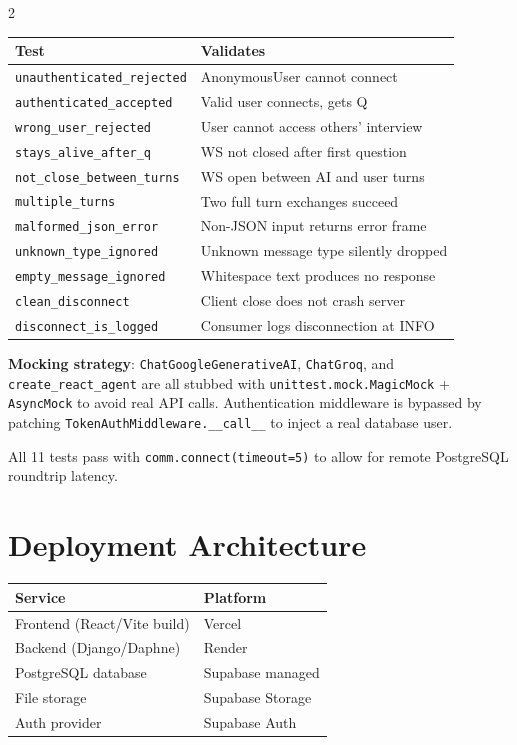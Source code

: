 \documentclass[10pt, a4paper]{article}
\begin{document}
\begin{multicols}{2}
\begin{center}
\scriptsize
\begin{tabular}{@{}p{3.8cm} p{2.5cm}@{}}
\toprule
\textbf{Test} & \textbf{Validates} \\
\midrule
\texttt{unauthenticated\_rejected} & AnonymousUser cannot connect \\
\texttt{authenticated\_accepted} & Valid user connects, gets Q \\
\texttt{wrong\_user\_rejected} & User cannot access others' interview \\
\texttt{stays\_alive\_after\_q} & WS not closed after first question \\
\texttt{not\_close\_between\_turns} & WS open between AI and user turns \\
\texttt{multiple\_turns} & Two full turn exchanges succeed \\
\texttt{malformed\_json\_error} & Non-JSON input returns error frame \\
\texttt{unknown\_type\_ignored} & Unknown message type silently dropped \\
\texttt{empty\_message\_ignored} & Whitespace text produces no response \\
\texttt{clean\_disconnect} & Client close does not crash server \\
\texttt{disconnect\_is\_logged} & Consumer logs disconnection at INFO \\
\bottomrule
\end{tabular}
\end{center}

\textbf{Mocking strategy}: \texttt{ChatGoogleGenerativeAI},
\texttt{ChatGroq}, and \texttt{create\_react\_agent} are all stubbed with
\texttt{unittest.mock.MagicMock} + \texttt{AsyncMock} to avoid real API
calls. Authentication middleware is bypassed by patching
\texttt{TokenAuthMiddleware.\_\_call\_\_} to inject a real database user.

All 11 tests pass with \texttt{comm.connect(timeout=5)} to allow for
remote PostgreSQL roundtrip latency.

\section{Deployment Architecture}

\begin{center}
\small
\begin{tabular}{@{}ll@{}}
\toprule
\textbf{Service} & \textbf{Platform} \\
\midrule
Frontend (React/Vite build) & Vercel \\
Backend (Django/Daphne) & Render \\
PostgreSQL database & Supabase managed \\
File storage & Supabase Storage \\
Auth provider & Supabase Auth \\
\bottomrule
\end{tabular}
\end{center}


\end{multicols}
\end{document}
